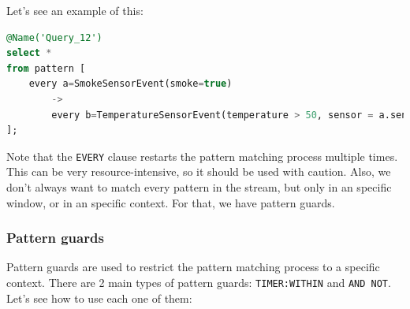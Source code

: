 \begin{itemize}
    Let's see an example of this:\\

    \begin{lstlisting}[language=SQL]
@Name('Query_12')
select *
from pattern [
    every a=SmokeSensorEvent(smoke=true) 
        ->
        every b=TemperatureSensorEvent(temperature > 50, sensor = a.sensor)
];
    \end{lstlisting}

\end{itemize}

Note that the \texttt{EVERY} clause restarts the pattern matching process multiple times.
This can be very resource-intensive, so it should be used with caution. Also, we don't always
want to match every pattern in the stream, but only in an specific window, or in an specific 
context. For that, we have pattern guards.

\subsubsection{Pattern guards}

Pattern guards are used to restrict the pattern matching process to a specific context.
There are 2 main types of pattern guards: \texttt{TIMER:WITHIN} and \texttt{AND NOT}.
Let's see how to use each one of them:


